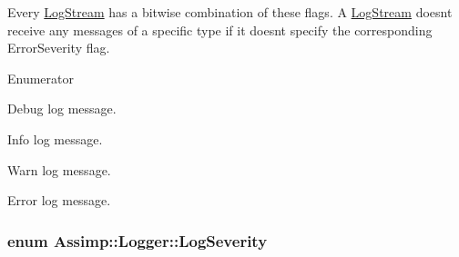 Every \hyperlink{class_assimp_1_1_log_stream}{Log\+Stream} has a bitwise combination of these flags. A \hyperlink{class_assimp_1_1_log_stream}{Log\+Stream} doesn\textquotesingle{}t receive any messages of a specific type if it doesn\textquotesingle{}t specify the corresponding Error\+Severity flag. \begin{Desc}
\item[Enumerator]\par
\begin{description}
\item[{\em 
Debugging\hypertarget{class_assimp_1_1_logger_acd0b52a87d6fc11e957ed2c6e2ad75b6a0cb475014d27098c3423738c571d857f}{}\label{class_assimp_1_1_logger_acd0b52a87d6fc11e957ed2c6e2ad75b6a0cb475014d27098c3423738c571d857f}
}]Debug log message. \item[{\em 
Info\hypertarget{class_assimp_1_1_logger_acd0b52a87d6fc11e957ed2c6e2ad75b6aa3377a574928b86f7de55c5df154f461}{}\label{class_assimp_1_1_logger_acd0b52a87d6fc11e957ed2c6e2ad75b6aa3377a574928b86f7de55c5df154f461}
}]Info log message. \item[{\em 
Warn\hypertarget{class_assimp_1_1_logger_acd0b52a87d6fc11e957ed2c6e2ad75b6a1279c77aaee5a3d7df835a9b9305a697}{}\label{class_assimp_1_1_logger_acd0b52a87d6fc11e957ed2c6e2ad75b6a1279c77aaee5a3d7df835a9b9305a697}
}]Warn log message. \item[{\em 
Err\hypertarget{class_assimp_1_1_logger_acd0b52a87d6fc11e957ed2c6e2ad75b6a71054d0b1323abcea46d050d69013d27}{}\label{class_assimp_1_1_logger_acd0b52a87d6fc11e957ed2c6e2ad75b6a71054d0b1323abcea46d050d69013d27}
}]Error log message. \end{description}
\end{Desc}
\subsubsection[{\texorpdfstring{Log\+Severity}{LogSeverity}}]{\setlength{\rightskip}{0pt plus 5cm}enum {\bf Assimp\+::\+Logger\+::\+Log\+Severity}}\hypertarget{class_assimp_1_1_logger_a8b6248a0fd062431e8572556350d29e6}{}\label{class_assimp_1_1_logger_a8b6248a0fd062431e8572556350d29e6}


